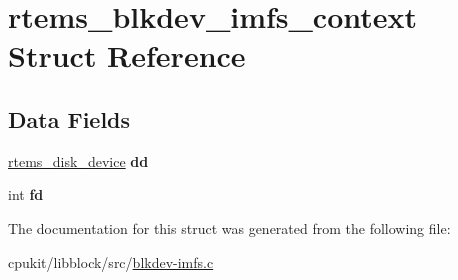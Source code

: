\hypertarget{structrtems__blkdev__imfs__context}{}\section{rtems\+\_\+blkdev\+\_\+imfs\+\_\+context Struct Reference}
\label{structrtems__blkdev__imfs__context}
\subsection*{Data Fields}
\begin{DoxyCompactItemize}
\item 
\mbox{\label{structrtems__blkdev__imfs__context_a3e63ac0583208fc15bf41fb6e1cfcc75}} 
\mbox{\hyperlink{structrtems__disk__device}{rtems\+\_\+disk\+\_\+device}} {\bfseries dd}
\item 
\mbox{\label{structrtems__blkdev__imfs__context_a15158642fbd5114a4c7a66420883d959}} 
int {\bfseries fd}
\end{DoxyCompactItemize}


The documentation for this struct was generated from the following file\+:\begin{DoxyCompactItemize}
\item 
cpukit/libblock/src/\mbox{\hyperlink{blkdev-imfs_8c}{blkdev-\/imfs.\+c}}\end{DoxyCompactItemize}

